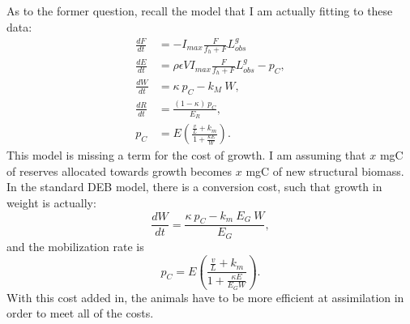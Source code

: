 \documentclass[12pt,reqno,final,pdftex]{amsart}\usepackage[]{graphicx}\usepackage[]{color}
\theoremstyle{plain}
\numberwithin{equation}{part}
\begin{document}
As to the former question, recall the model that I am actually fitting to these data:
\begin{align}
\frac{dF}{dt} &= -I_{max} \frac{F}{f_h+F} L_{obs}^g \\
\frac{dE}{dt} &= \rho \epsilon V I_{max} \frac{F}{f_h+F} L_{obs}^g - p_C, \\
\frac{dW}{dt} &= \kappa~p_C - k_M~W, \\
\frac{dR}{dt} &= \frac{(1-\kappa)~p_C}{E_R}, \\
p_C &= E \left(\frac{\frac{v}{L} + k_m}{1+\frac{\kappa E}{W}}\right).
\end{align}
This model is missing a term for the cost of growth.
I am assuming that $x$ mgC of reserves allocated towards growth becomes $x$ mgC of new structural biomass.
In the standard DEB model, there is a conversion cost, such that growth in weight is actually:
\begin{equation}
\frac{dW}{dt} = \frac{\kappa~p_C - k_m~E_G~W}{E_G},
\end{equation}
and the mobilization rate is
\begin{equation}
p_C = E \left(\frac{\frac{v}{L} + k_m}{1+\frac{\kappa E}{E_G W}}\right).
\end{equation}
With this cost added in, the animals have to be more efficient at assimilation in order to meet all of the costs.
\end{document}
